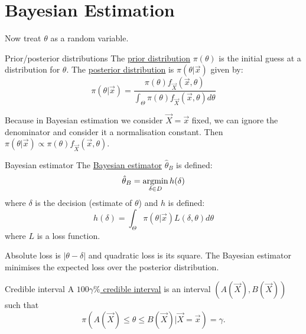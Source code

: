 \documentclass[../Main.tex]{subfiles}
\begin{document}
\section{Bayesian Estimation}
Now treat $\theta$ as a random variable.
\begin{definition}{Prior/posterior distributions}
    The \underline{prior distribution} $\pi(\theta)$ is the initial guess at a distribution for $\theta$. The \underline{posterior distribution} is $\pi(\theta | \vec{x})$ given by:
    \begin{equation*}
        \pi(\theta | \vec{x}) = \frac{\pi(\theta) f_{\vec{X}}(\vec{x}, \theta)}{\int_\Theta \pi(\theta) f_{\vec{X}}(\vec{x}, \theta) d\theta}
    \end{equation*}
\end{definition}
Because in Bayesian estimation we consider $\vec{X} = \vec{x}$ fixed, we can ignore the denominator and consider it a normalisation constant. Then $\pi(\theta | \vec{x}) \propto \pi(\theta) f_{\vec{X}}(\vec{x}, \theta)$.

\begin{definition}{Bayesian estimator}
    The \underline{Bayesian estimator} $\hat{\theta}_B$ is defined:
    \begin{equation*}
        \hat{\theta}_B = \operatorname*{argmin}_{\delta \in D} h(\delta)
    \end{equation*}
    where $\delta$ is the decision (estimate of $\theta$) and $h$ is defined:
    \begin{equation*}
        h(\delta) = \int_\Theta \pi(\theta | \vec{x}) L(\delta, \theta) d\theta
    \end{equation*}
    where $L$ is a loss function.
\end{definition}
Absolute loss is $|\theta - \delta|$ and quadratic loss is its square. The Bayesian estimator minimises the expected loss over the posterior distribution.
\begin{definition}{Credible interval}
    A \underline{$100\gamma\%$ credible interval} is an interval $(A(\vec{X}), B(\vec{X}))$ such that
    \begin{equation*}
        \pi(A(\vec{X}) \leq \theta \leq B(\vec{X}) | \vec{X} = \vec{x}) = \gamma.
    \end{equation*}
\end{definition}
\end{document}
